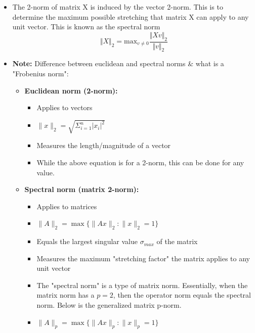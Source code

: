 \documentclass[11.5pt,a4paper]{article}
\begin{document}
\begin{itemize}
\begin{equation*}
    \end{equation*}
    \begin{itemize}
        \item The 2-norm of matrix X is induced by the vector 2-norm. This is to determine the maximum possible stretching that matrix X can apply to any unit vector. This is known as the spectral norm
        \begin{equation*}
            \Vert X \Vert_2 = \text{max}_{v \neq 0}\frac{\Vert Xv \Vert_2}{\Vert v \Vert_2}
        \end{equation*}
        \item \textbf{Note:} Difference between euclidean and spectral norms \& what is a "Frobenius norm":
        \begin{itemize}
            \item \textbf{Euclidean norm (2-norm):}
            \begin{itemize}
               \item Applies to vectors
               \item $\|x\|_2 = \sqrt{\Sigma_{i=1}^n |x_i|^2}$
               \item Measures the length/magnitude of a vector
               \item While the above equation is for a 2-norm, this can be done for any value. 
            \end{itemize}
            
            \item \textbf{Spectral norm (matrix 2-norm):}
            \begin{itemize}
               \item Applies to matrices
               \item $\|A\|_2 = \max\{\|Ax\|_2 : \|x\|_2 = 1\}$
               \item Equals the largest singular value $\sigma_{max}$ of the matrix
               \item Measures the maximum "stretching factor" the matrix applies to any unit vector
               \item The "spectral norm" is a type of matrix norm. Essentially, when the matrix norm has a $p=2$, then the operator norm equals the spectral norm. Below is the generalized matrix p-norm.
               \item $\|A\|_p = \max\{\|Ax\|_p : \|x\|_p = 1\}$
            \end{itemize}


\end{itemize}
\end{itemize}
\end{itemize}
\end{document}
